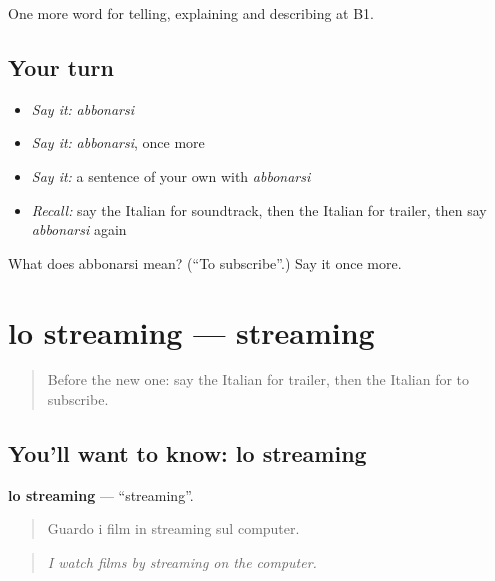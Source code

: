 \begin{grammarlens}[title={What you've built}]
One more word for telling, explaining and describing at B1.
\end{grammarlens}

\subsection*{Your turn}
\begin{itemize}
\raggedright
  \item \emph{Say it:} \emph{abbonarsi}
  \item \emph{Say it:} \emph{abbonarsi}, once more
  \item \emph{Say it:} a sentence of your own with \emph{abbonarsi}
  \item \emph{Recall:} say the Italian for soundtrack, then the Italian for trailer, then say \emph{abbonarsi} again
\end{itemize}

\begin{tcolorbox}[breakable,colback=teal!4,colframe=teal!35!black,title={Before you move on}]
What does abbonarsi mean? (\textquotedblleft{}To subscribe\textquotedblright{}.) Say it once more.
\end{tcolorbox}
\section[lo streaming]{lo streaming — streaming}

\label{lesson:IT-C530-streaming}



\begin{quote}
Before the new one: say the Italian for trailer, then the Italian for to subscribe.
\end{quote}

\subsection*{You'll want to know: lo streaming}
\textbf{lo streaming} — \textquotedblleft{}streaming\textquotedblright{}.

\begin{quote}
Guardo i film in streaming sul computer.
\end{quote}

\begin{quote}
\emph{I watch films by streaming on the computer.}
\end{quote}


